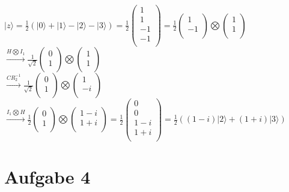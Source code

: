 \documentclass[a4paper]{scrartcl}
\begin{document}
$|z\rangle = \frac{1}{2} (|0\rangle + |1\rangle - |2\rangle - |3\rangle) = \frac{1}{2} \begin{pmatrix} 1\\1\\-1\\-1\\\end{pmatrix} = \frac{1}{2} \begin{pmatrix} 1\\-1\\\end{pmatrix} \bigotimes \begin{pmatrix} 1\\1\\\end{pmatrix}$\\
$\xrightarrow{H\bigotimes I_1} \frac{1}{\sqrt{2}} \begin{pmatrix} 0\\1\\\end{pmatrix} \bigotimes \begin{pmatrix} 1\\1\\\end{pmatrix}$\\
$\xrightarrow{CR_2^{-1}}\frac{1}{\sqrt{2}} \begin{pmatrix} 0\\1\\\end{pmatrix} \bigotimes \begin{pmatrix} 1\\-i\\\end{pmatrix}$\\
$\xrightarrow{I_1\bigotimes H} \frac{1}{2} \begin{pmatrix} 0\\1\\\end{pmatrix} \bigotimes \begin{pmatrix} 1-i\\1+i\\\end{pmatrix} = \frac{1}{2}\begin{pmatrix} 0\\0\\1-i\\1+i\\\end{pmatrix} = \frac{1}{2} ((1-i)|2\rangle + (1+i)|3\rangle)$\\

\newpage
\section*{Aufgabe 4}
\end{document}
